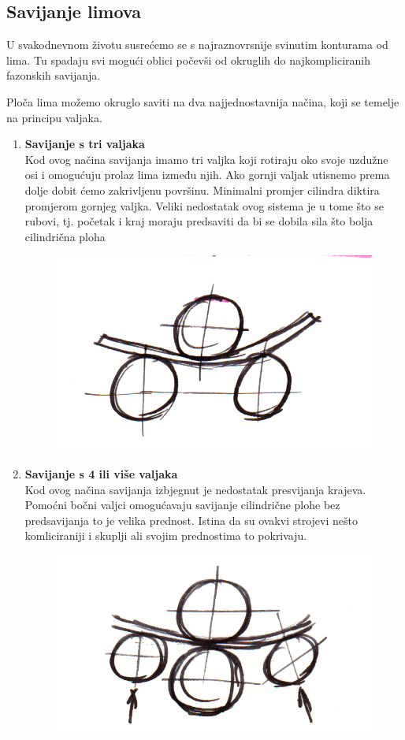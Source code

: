 \documentclass[a4paper,12pt]{article}
\numberwithin{figure}{section}
\begin{document}
\subsection{Savijanje limova}
U svakodnevnom životu susrećemo se s najraznovrsnije svinutim konturama od lima. Tu spadaju svi mogući oblici počevši od okruglih do najkompliciranih fazonskih savijanja. \par
Ploča lima možemo okruglo saviti na dva najjednostavnija načina, koji se temelje na principu valjaka.
\begin{enumerate}
\item \textbf{Savijanje s tri valjaka} \\
Kod ovog načina savijanja imamo tri valjka koji rotiraju oko svoje uzdužne osi i omogućuju prolaz lima između njih. Ako gornji valjak utisnemo prema dolje dobit ćemo zakrivljenu površinu. Minimalni promjer cilindra diktira promjerom gornjeg valjka. Veliki nedostatak ovog sistema je u tome što se rubovi, tj. početak i kraj moraju predsaviti da bi se dobila sila što bolja cilindrična ploha
\begin{figure}[!h]
\centering
\includegraphics[scale=0.15]{image_48-1.png}
\end{figure}
\FloatBarrier
\item \textbf{Savijanje s 4 ili više valjaka} \\
Kod ovog načina savijanja izbjegnut je nedostatak presvijanja krajeva. Pomoćni bočni valjci omogućavaju savijanje cilindrične plohe bez predsavijanja to je velika prednost. Istina da su ovakvi strojevi nešto komliciraniji i skuplji ali svojim prednostima to pokrivaju.
\begin{figure}[!h]
\centering
\includegraphics[scale=0.15]{image_48-2.png}

\end{figure}
\end{enumerate}
\end{document}
